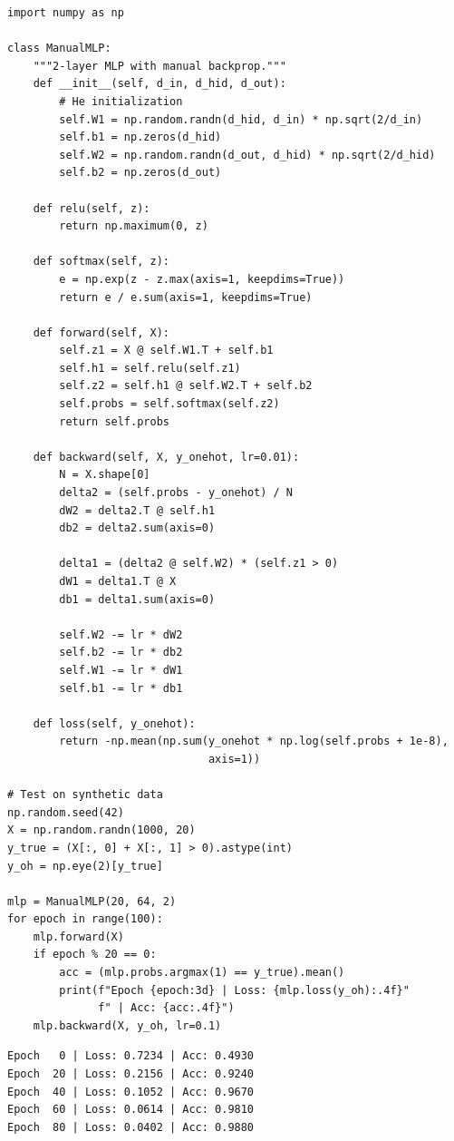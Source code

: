 \begin{codeblock}[title=\textbf{Manual Backpropagation (without autograd)}]
\begin{verbatim}
import numpy as np

class ManualMLP:
    """2-layer MLP with manual backprop."""
    def __init__(self, d_in, d_hid, d_out):
        # He initialization
        self.W1 = np.random.randn(d_hid, d_in) * np.sqrt(2/d_in)
        self.b1 = np.zeros(d_hid)
        self.W2 = np.random.randn(d_out, d_hid) * np.sqrt(2/d_hid)
        self.b2 = np.zeros(d_out)

    def relu(self, z):
        return np.maximum(0, z)

    def softmax(self, z):
        e = np.exp(z - z.max(axis=1, keepdims=True))
        return e / e.sum(axis=1, keepdims=True)

    def forward(self, X):
        self.z1 = X @ self.W1.T + self.b1
        self.h1 = self.relu(self.z1)
        self.z2 = self.h1 @ self.W2.T + self.b2
        self.probs = self.softmax(self.z2)
        return self.probs

    def backward(self, X, y_onehot, lr=0.01):
        N = X.shape[0]
        delta2 = (self.probs - y_onehot) / N
        dW2 = delta2.T @ self.h1
        db2 = delta2.sum(axis=0)

        delta1 = (delta2 @ self.W2) * (self.z1 > 0)
        dW1 = delta1.T @ X
        db1 = delta1.sum(axis=0)

        self.W2 -= lr * dW2
        self.b2 -= lr * db2
        self.W1 -= lr * dW1
        self.b1 -= lr * db1

    def loss(self, y_onehot):
        return -np.mean(np.sum(y_onehot * np.log(self.probs + 1e-8),
                               axis=1))

# Test on synthetic data
np.random.seed(42)
X = np.random.randn(1000, 20)
y_true = (X[:, 0] + X[:, 1] > 0).astype(int)
y_oh = np.eye(2)[y_true]

mlp = ManualMLP(20, 64, 2)
for epoch in range(100):
    mlp.forward(X)
    if epoch % 20 == 0:
        acc = (mlp.probs.argmax(1) == y_true).mean()
        print(f"Epoch {epoch:3d} | Loss: {mlp.loss(y_oh):.4f}"
              f" | Acc: {acc:.4f}")
    mlp.backward(X, y_oh, lr=0.1)
\end{verbatim}
\end{codeblock}

\begin{codeoutput}
\begin{verbatim}
Epoch   0 | Loss: 0.7234 | Acc: 0.4930
Epoch  20 | Loss: 0.2156 | Acc: 0.9240
Epoch  40 | Loss: 0.1052 | Acc: 0.9670
Epoch  60 | Loss: 0.0614 | Acc: 0.9810
Epoch  80 | Loss: 0.0402 | Acc: 0.9880
\end{verbatim}
\end{codeoutput}

